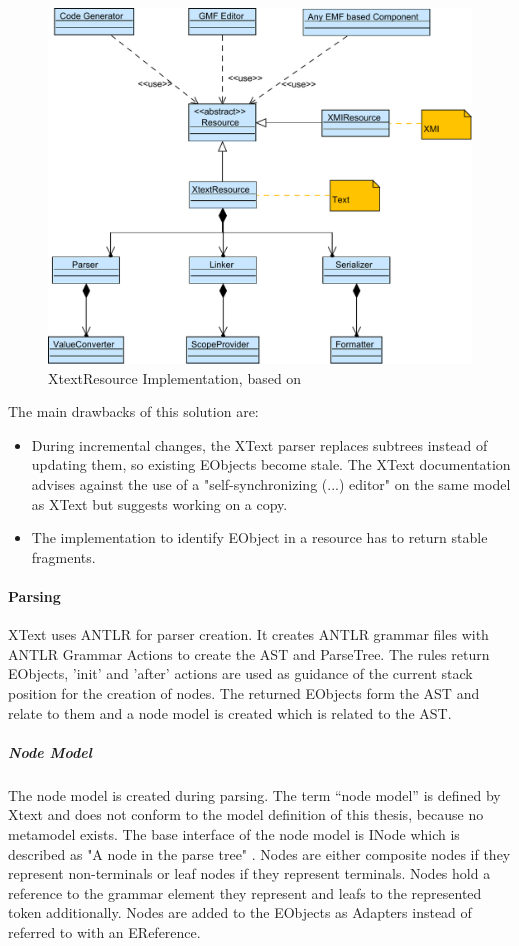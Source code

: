 \begin{figure}
\centering
\includegraphics[scale=0.75]{gfx/ex/Xtext} 
\caption{XtextResource Implementation, based on \cite{XTextMan}}
\label{XtextArch}
\end{figure}
The main drawbacks of this solution are:
\begin{itemize}
	\item During incremental changes, the XText parser replaces subtrees instead of updating them, so existing EObjects become stale. The XText documentation advises against the use of a "self-synchronizing (...) editor" on the same model as XText but suggests working on a copy.
	\item The implementation to identify EObject in a resource has to return stable fragments.
\end{itemize}

\paragraph{Parsing}
XText uses ANTLR \cite{ANTLR} for parser creation. It creates ANTLR grammar files with ANTLR Grammar Actions to create the AST and ParseTree. The rules return EObjects, 'init' and 'after' actions are used as guidance of the current stack position for the creation of nodes. The returned EObjects form the AST and relate to them and a node model is created which is related to the AST. 

\subparagraph{Node Model}
The node model is created during parsing. The term ``node model'' is defined by Xtext and does not conform to the model definition of this thesis, because no metamodel exists. The base interface of the node model is INode which  is described as "A node in the parse tree" \cite{XTextAPI}. Nodes are either composite nodes if they represent non-terminals or leaf nodes if they represent terminals. Nodes hold a reference to the grammar element they represent and leafs to the represented token additionally. Nodes are added to the EObjects as Adapters instead of referred to with an EReference.

